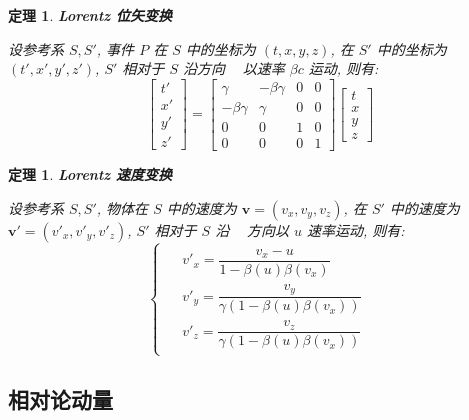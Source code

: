\documentclass[UTF8]{ctexart}
\newcommand{\<}{\langle}
\renewcommand{\>}{\rangle}                              %
\newenvironment{thm_box}{
    \begin{tcolorbox}[enhanced, colback=thm_blue2, boxrule=0pt, frame hidden,
        borderline west={0.7mm}{0.1mm}{thm_blue1},breakable]
    }
    {\end{tcolorbox}}
\theoremstyle{MyStyle} %
\newtheorem{theorem}[definition]{定理}
\newenvironment{thm}{\begin{thm_box}\begin{theorem}}{\end{theorem}\end{thm_box}}
\DeclareMathOperator{\ihat}{\bm{\hat{\imath}}}
\begin{document}
        \begin{thm}
            \textbf{Lorentz 位矢变换}

            设参考系 \(S, S'\), 事件 \(P\) 在 \(S\) 中的坐标为 \((t, x, y, z)\),
            在 \(S'\) 中的坐标为 \((t', x', y', z')\), \(S'\) 相对于 \(S\) 沿方向 \(\ihat\) 以速率 \(\beta c\) 运动, 则有: 
            \[
            \begin{bmatrix}
                t' \\
                x' \\
                y' \\
                z'
            \end{bmatrix}
            =
            \begin{bmatrix}
                \gamma & -\beta\gamma & 0 & 0 \\
                -\beta\gamma & \gamma & 0 & 0 \\
                0 & 0 & 1 & 0 \\
                0 & 0 & 0 & 1
            \end{bmatrix}
            \begin{bmatrix}
                t \\
                x \\
                y \\
                z
            \end{bmatrix}\]
        \end{thm}
        
        \begin{thm}
            \textbf{Lorentz 速度变换}

            设参考系 \(S, S'\), 物体在 \(S\) 中的速度为 \(\bm{v} = (v_x, v_y, v_z)\), 在 \(S'\) 中的速度为 \(\bm{v}' = (v'_x, v'_y, v'_z)\), 
            \(S'\) 相对于 \(S\) 沿 \(\ihat\) 方向以 \(u\) 速率运动, 则有: 
            \[
            \begin{cases}
            \begin{aligned}
                & v'_x = \dfrac{v_x - u}{1 - \beta(u)\beta(v_x)} \\
                & v'_y = \dfrac{v_y}{\gamma(1 - \beta(u)\beta(v_x))} \\
                & v'_z = \dfrac{v_z}{\gamma(1 - \beta(u)\beta(v_x))}
            \end{aligned}
            \end{cases}\]
        \end{thm}

    \subsection{相对论动量}
        
\end{document}
